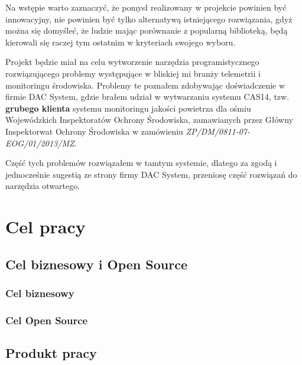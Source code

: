 Na wstępie warto zaznaczyć, że pomysł realizowany w projekcie powinien być innowacyjny, nie powinien być tylko alternatywą istniejącego rozwiązania, gdyż można się domyśleć, że ludzie mając porównanie z popularną biblioteką, będą kierowali się raczej tym ostatnim w kryteriach swojego wyboru.

Projekt będzie miał na celu wytworzenie narzędzia programistycznego rozwiązującego problemy występujące w bliskiej mi branży telemetrii i monitoringu środowiska. Problemy te poznałem zdobywając doświadczenie w firmie DAC System, gdzie brałem udział w wytwarzaniu systemu CAS14, tzw. \textbf{grubego klienta} systemu monitoringu jakości powietrza dla ośmiu Wojewódzkich Inspektoratów Ochrony Środowiska, zamawianych przez Główny Inspektorwat Ochrony Środowiska w zamówieniu \textsl{ZP/DM/0811-07-EOG/01/2013/MZ}.

Część tych problemów rozwiązałem w tamtym systemie, dlatego za zgodą i jednocześnie sugestią ze strony firmy DAC System, przeniosę część rozwiązań do narzędzia otwartego.


\section{Cel pracy}

\subsection{Cel biznesowy i Open Source}

\subsubsection*{Cel biznesowy}
\subsubsection*{Cel Open Source}

\subsection{Produkt pracy}

